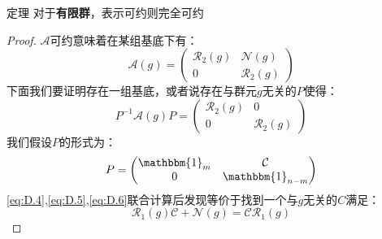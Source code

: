 \begin{theorem}{定理}
    对于\textbf{有限群}，表示可约则完全可约
\end{theorem}
\begin{proof}
    $\mathscr{A}$可约意味着在某组基底下有：
    \begin{equation}
        \label{eq:D.4}
        \mathcal{A}(g)=\begin{pmatrix}
            \mathcal{R}_2(g) & \mathcal{N}(g) \\
             {0} & \mathcal{R}_2(g)
           \end{pmatrix}
    \end{equation}
    下面我们要证明存在一组基底，或者说存在与群元$g$无关的$P$使得：
    \begin{equation}
        \label{eq:D.5}
        P^{-1}\mathcal{A}(g)P=\begin{pmatrix}
            \mathcal{R}_2(g) &{0} \\
             {0} & \mathcal{R}_2(g)
           \end{pmatrix}
    \end{equation}
    我们假设$P$的形式为：
    \begin{equation}
        \label{eq:D.6}
        P=\begin{pmatrix}
            \mathbbm{1}_m &\mathcal{C} \\
             {0} & \mathbbm{1}_{n-m}
           \end{pmatrix}
    \end{equation}
    \ref{eq:D.4},\ref{eq:D.5},\ref{eq:D.6}联合计算后发现等价于找到一个与$g$无关的$C$满足：
    \begin{equation}
        \label{eq:D.7}
        \mathcal{R}_1(g)\mathcal{C}+\mathcal{N}(g)=\mathcal{C}\mathcal{R}_1(g)
    \end{equation}
    

\end{proof}
